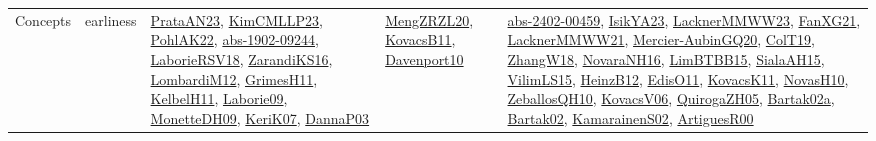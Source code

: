 {\begin{longtable}{lp{3cm}>{\raggedright}p{6cm}>{\raggedright}p{6cm}p{8cm}}
Concepts & earliness & \href{articles/PrataAN23.pdf}{PrataAN23}\cite{PrataAN23}, \href{papers/KimCMLLP23.pdf}{KimCMLLP23}\cite{KimCMLLP23}, \href{articles/PohlAK22.pdf}{PohlAK22}\cite{PohlAK22}, \href{articles/abs-1902-09244.pdf}{abs-1902-09244}\cite{abs-1902-09244}, \href{articles/LaborieRSV18.pdf}{LaborieRSV18}\cite{LaborieRSV18}, \href{articles/ZarandiKS16.pdf}{ZarandiKS16}\cite{ZarandiKS16}, \href{articles/LombardiM12.pdf}{LombardiM12}\cite{LombardiM12}, \href{papers/GrimesH11.pdf}{GrimesH11}\cite{GrimesH11}, \href{articles/KelbelH11.pdf}{KelbelH11}\cite{KelbelH11}, \href{papers/Laborie09.pdf}{Laborie09}\cite{Laborie09}, \href{papers/MonetteDH09.pdf}{MonetteDH09}\cite{MonetteDH09}, \href{papers/KeriK07.pdf}{KeriK07}\cite{KeriK07}, \href{papers/DannaP03.pdf}{DannaP03}\cite{DannaP03} & \href{articles/MengZRZL20.pdf}{MengZRZL20}\cite{MengZRZL20}, \href{articles/KovacsB11.pdf}{KovacsB11}\cite{KovacsB11}, \href{papers/Davenport10.pdf}{Davenport10}\cite{Davenport10} & \href{articles/abs-2402-00459.pdf}{abs-2402-00459}\cite{abs-2402-00459}, \href{articles/IsikYA23.pdf}{IsikYA23}\cite{IsikYA23}, \href{articles/LacknerMMWW23.pdf}{LacknerMMWW23}\cite{LacknerMMWW23}, \href{articles/FanXG21.pdf}{FanXG21}\cite{FanXG21}, \href{papers/LacknerMMWW21.pdf}{LacknerMMWW21}\cite{LacknerMMWW21}, \href{papers/Mercier-AubinGQ20.pdf}{Mercier-AubinGQ20}\cite{Mercier-AubinGQ20}, \href{papers/ColT19.pdf}{ColT19}\cite{ColT19}, \href{articles/ZhangW18.pdf}{ZhangW18}\cite{ZhangW18}, \href{articles/NovaraNH16.pdf}{NovaraNH16}\cite{NovaraNH16}, \href{papers/LimBTBB15.pdf}{LimBTBB15}\cite{LimBTBB15}, \href{papers/SialaAH15.pdf}{SialaAH15}\cite{SialaAH15}, \href{papers/VilimLS15.pdf}{VilimLS15}\cite{VilimLS15}, \href{papers/HeinzB12.pdf}{HeinzB12}\cite{HeinzB12}, \href{papers/EdisO11.pdf}{EdisO11}\cite{EdisO11}, \href{articles/KovacsK11.pdf}{KovacsK11}\cite{KovacsK11}, \href{articles/NovasH10.pdf}{NovasH10}\cite{NovasH10}, \href{articles/ZeballosQH10.pdf}{ZeballosQH10}\cite{ZeballosQH10}, \href{papers/KovacsV06.pdf}{KovacsV06}\cite{KovacsV06}, \href{papers/QuirogaZH05.pdf}{QuirogaZH05}\cite{QuirogaZH05}, \href{papers/Bartak02a.pdf}{Bartak02a}\cite{Bartak02a}, \href{papers/Bartak02.pdf}{Bartak02}\cite{Bartak02}, \href{papers/KamarainenS02.pdf}{KamarainenS02}\cite{KamarainenS02}, \href{articles/ArtiguesR00.pdf}{ArtiguesR00}\cite{ArtiguesR00}\\

\end{longtable}}
